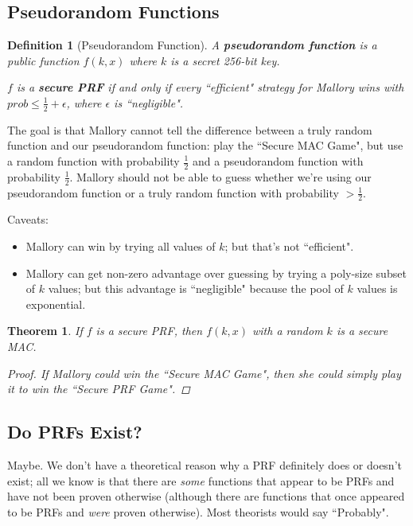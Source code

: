 \documentclass[12pt]{article}
\newtheorem{thm}{Theorem}[section]
\newtheorem*{mydef}{Definition}
\begin{document}
\subsection*{Pseudorandom Functions}

\begin{mydef}[Pseudorandom Function]
A \textbf{pseudorandom function} is a public function $f(k, x)$ where $k$ is a secret 256-bit key.

$f$ is a \textbf{secure PRF} if and only if every ``efficient" strategy for Mallory wins with $prob \leq \frac{1}{2} + \epsilon$, where $\epsilon$ is ``negligible".
\end{mydef}

The goal is that Mallory cannot tell the difference between a truly random function and our pseudorandom function: play the ``Secure MAC Game", but use a random function with probability $\frac{1}{2}$ and a pseudorandom function with probability $\frac{1}{2}$. Mallory should not be able to guess whether we're using our pseudorandom function or a truly random function with probability $> \frac{1}{2}$.

Caveats:
\begin{itemize}
\item Mallory can win by trying all values of $k$; but that's not ``efficient".
\item Mallory can get non-zero advantage over guessing by trying a poly-size subset of $k$ values; but this advantage is ``negligible" because the pool of $k$ values is exponential.
\end{itemize}

\begin{thm}
If $f$ is a secure PRF, then $f(k, x)$ with a random $k$ is a secure MAC.
\begin{proof}
If Mallory could win the ``Secure MAC Game", then she could simply play it to win the ``Secure PRF Game".
\end{proof}
\end{thm}

\subsection*{Do PRFs Exist?}

Maybe. We don't have a theoretical reason why a PRF definitely does or doesn't exist; all we know is that there are \textit{some} functions that appear to be PRFs and have not been proven otherwise (although there are functions that once appeared to be PRFs and \textit{were} proven otherwise). Most theorists would say ``Probably".
\end{document}
